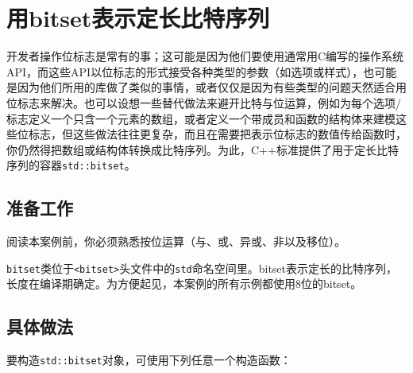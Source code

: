\section{用bitset表示定长比特序列}



开发者操作位标志是常有的事；这可能是因为他们要使用通常用C编写的操作系统API，而这些API以位标志的形式接受各种类型的参数（如选项或样式），也可能是因为他们所用的库做了类似的事情，或者仅仅是因为有些类型的问题天然适合用位标志来解决。也可以设想一些替代做法来避开比特与位运算，例如为每个选项/标志定义一个只含一个元素的数组，或者定义一个带成员和函数的结构体来建模这些位标志，但这些做法往往更复杂，而且在需要把表示位标志的数值传给函数时，你仍然得把数组或结构体转换成比特序列。为此，C++标准提供了用于定长比特序列的容器\texttt{std::\allowbreak{}bitset}。



\subsection{准备工作}



阅读本案例前，你必须熟悉按位运算（与、或、异或、非以及移位）。



\texttt{bitset}类位于\texttt{<\allowbreak{}bitset>}头文件中的\texttt{std}命名空间里。bitset表示定长的比特序列，长度在编译期确定。为方便起见，本案例的所有示例都使用8位的bitset。



\subsection{具体做法}



要构造\texttt{std::\allowbreak{}bitset}对象，可使用下列任意一个构造函数：



